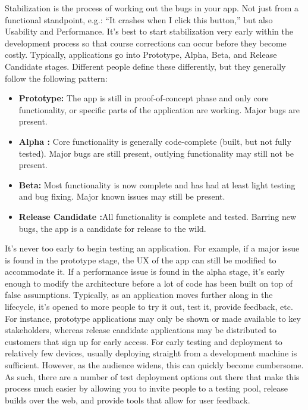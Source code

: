 Stabilization is the process of working out the bugs in your app. Not just from a functional standpoint, e.g.: “It crashes when I click this button,” but also Usability and Performance. It’s best to start stabilization very early within the development process so that course corrections can occur before they become costly. Typically, applications go into Prototype, Alpha, Beta, and Release Candidate stages. Different people define these differently, but they generally follow the following pattern:

\begin{itemize}


 \item \textbf{Prototype:}   The app is still in proof-of-concept phase and only core functionality, or specific parts of the application are working. Major bugs are present.
\item \textbf{Alpha :} Core functionality is generally code-complete (built, but not fully tested). Major bugs are still present, outlying functionality may still not be present.
\item \textbf{Beta:}  Most functionality is now complete and has had at least light testing and bug fixing. Major known issues may still be present.
\item \textbf{Release Candidate :}All functionality is complete and tested. Barring new bugs, the app is a candidate for release to the wild.
\end{itemize}

It’s never too early to begin testing an application. For example, if a major issue is found in the prototype stage, the UX of the app can still be modified to accommodate it. If a performance issue is found in the alpha stage, it’s early enough to modify the architecture before a lot of code has been built on top of false assumptions.
Typically, as an application moves further along in the lifecycle, it’s opened to more people to try it out, test it, provide feedback, etc. For instance, prototype applications may only be shown or made available to key stakeholders, whereas release candidate applications may be distributed to customers that sign up for early access.
For early testing and deployment to relatively few devices, usually deploying straight from a development machine is sufficient. However, as the audience widens, this can quickly become cumbersome. As such, there are a number of test deployment options out there that make this process much easier by allowing you to invite people to a testing pool, release builds over the web, and provide tools that allow for user feedback.

